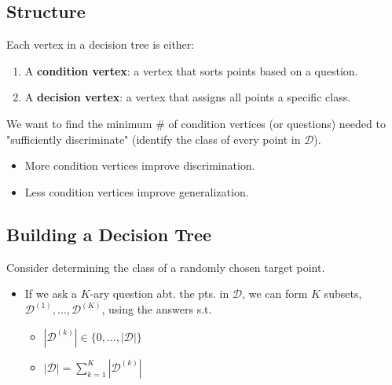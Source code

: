 \subsection{Structure}
\begin{definition}
    Each vertex in a decision tree is either:
    \begin{enumerate}
        \item A \textbf{condition vertex}: a vertex that sorts points based on a question.
        \item A \textbf{decision vertex}: a vertex that assigns all points a specific class.
    \end{enumerate}
\end{definition}

\begin{notes}
    We want to find the minimum \# of condition vertices (or questions) needed to "sufficiently discriminate" (identify the class of every point in \(\mathcal{D}\)).
    \begin{itemize}
        \item More condition vertices improve discrimination.
        \item Less condition vertices improve generalization.
    \end{itemize}
\end{notes}

\subsection{Building a Decision Tree}
\begin{definition}
    Consider determining the class of a randomly chosen target point. 
    \begin{itemize}
        \item If we ask a $K$-ary question abt. the pts. in $\mathcal{D}$, we can form $K$ subsets, $\mathcal{D}^{(1)},\ldots,\mathcal{D}^{(K)}$, using the answers s.t. 
        \begin{itemize}
            \item $|\mathcal{D}^{(k)}| \in \{0,\ldots,|\mathcal{D}|\}$
            \item $|\mathcal{D}| = \sum_{k=1}^{K} |\mathcal{D}^{(k)}|$
        \end{itemize}
    \end{itemize}
\end{definition}
\newpage

